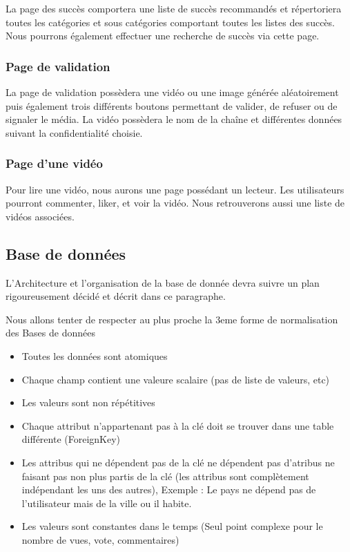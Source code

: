 \documentclass[a4paper,10pt]{article}
\begin{document}
La page des succès comportera une liste de succès recommandés et répertoriera toutes les catégories et sous catégories comportant toutes les listes des succès. Nous pourrons également effectuer une recherche de succès via cette page.

\subsubsection{Page de validation}

La page de validation possèdera une vidéo ou une image générée aléatoirement puis également trois différents boutons permettant de valider, de refuser ou de signaler le média. La vidéo possèdera le nom de la chaîne et différentes données suivant la confidentialité choisie.

\subsubsection{Page d'une vidéo}

Pour lire une vidéo, nous aurons une page possédant un lecteur. Les utilisateurs pourront commenter, liker, et voir la vidéo. Nous retrouverons aussi une liste de vidéos associées.

\subsection{Base de données}

L'Architecture et l'organisation de la base de donnée devra suivre un plan rigoureusement décidé et décrit dans ce paragraphe.

Nous allons tenter de respecter au plus proche la 3eme forme de normalisation des Bases de données

\begin{itemize}
\item Toutes les données sont atomiques 
\item Chaque champ contient une valeure scalaire (pas de liste de valeurs, etc)
\item Les valeurs sont non répétitives
\item Chaque attribut n'appartenant pas à la clé doit se trouver dans une table différente (ForeignKey)
\item Les attribus qui ne dépendent pas de la clé ne dépendent pas d'atribus ne faisant pas non plus partis de la clé (les attribus sont complètement indépendant les uns des autres), Exemple : Le pays ne dépend pas de l'utilisateur mais de la ville ou il habite.
\item Les valeurs sont constantes dans le temps (Seul point complexe pour le nombre de vues, vote, commentaires)
\end{itemize}
\end{document}

